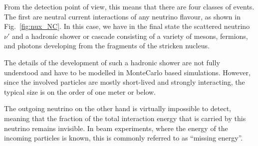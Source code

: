 From the detection point of view, this means that there are four classes of
events. The first are neutral current interactions of any neutrino flavour, as
shown in Fig.~\ref{fig:nux_NC}. In this case, we have in the final state the
scattered neutrino $\nu'$ and a hadronic shower or cascade consisting
of a variety of mesons, fermions, and photons developing from the fragments of
the stricken nucleus.

The details of the development of such a hadronic shower are not fully
understood and have to be modelled in MonteCarlo based simulations. However,
since the involved particles are mostly short-lived and strongly interacting,
the typical size is on the order of one meter or below. 

The outgoing neutrino on the other hand is virtually impossible to detect,
meaning that the fraction of the total interaction energy that is carried by
this neutrino remains invisible. In beam experiments, where the energy of the
incoming particles is known, this is commonly referred to as ``missing energy''.

